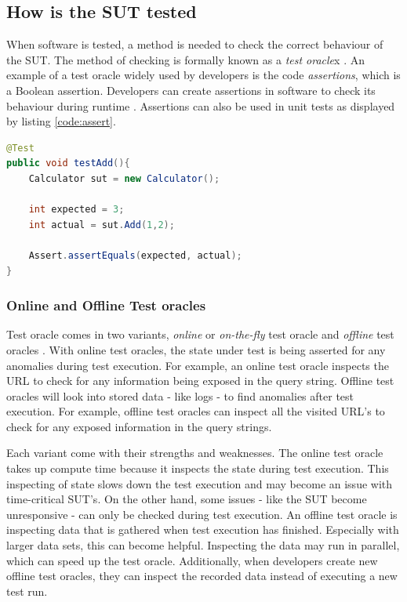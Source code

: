 
\subsection{How is the SUT tested}
When software is tested, a method is needed to check the correct behaviour of the SUT. The method of checking is formally known as a \emph{test oracle}x     \cite{testOracles}. An example of a test oracle widely used by developers is the code \emph{assertions}, which is a Boolean assertion. Developers can create assertions in software to check its behaviour during runtime \cite{barr2014oracle}. Assertions can also be used in unit tests as displayed by listing \ref{code:assert}. 

\begin{lstlisting}[language=Java, caption=Assertion, label=code:assert]
@Test
public void testAdd(){
    Calculator sut = new Calculator();

    int expected = 3;
    int actual = sut.Add(1,2);

    Assert.assertEquals(expected, actual);
}
\end{lstlisting}

\subsubsection{Online and Offline Test oracles}
Test oracle comes in two variants, \emph{online} or \emph{on-the-fly} test oracle and \emph{offline} test oracles \cite{VosAho2021}. With online test oracles, the state under test is being asserted for any anomalies during test execution. For example,  an online test oracle inspects the URL to check for any information being exposed in the query string. Offline test oracles will look into stored data - like logs - to find anomalies after test execution. For example, offline test oracles can inspect all the visited URL's to check for any exposed information in the query strings.

Each variant come with their strengths and weaknesses. The online test oracle takes up compute time because it inspects the state during test execution. This inspecting of state slows down the test execution and may become an issue with time-critical SUT's. On the other hand, some issues - like the SUT become unresponsive - can only be checked during test execution. An offline test oracle is inspecting data that is gathered when test execution has finished. Especially with larger data sets, this can become helpful. Inspecting the data may run in parallel, which can speed up the test oracle. Additionally, when developers create new offline test oracles, they can inspect the recorded data instead of executing a new test run. \cite{de2019offline}

